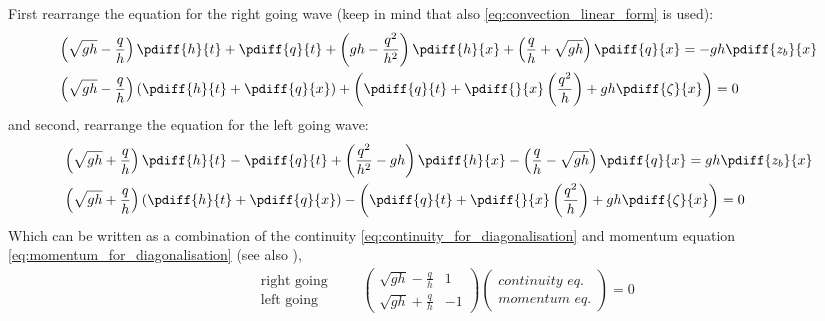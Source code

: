 First rearrange the equation for the right going wave (keep in mind that also \autoref{eq:convection_linear_form} is used):
\begin{align}
    &\left(\sqrt{gh} - \frac{q}{h}\right)\pdiff{h}{t} + \pdiff{q}{t} +
     \left( gh - \frac{q^2}{h^2} \right)\pdiff{h}{x} + \left( \frac{q}{h} + \sqrt{gh}\right) \pdiff{q}{x} = -gh\pdiff{z_b}{x}
     \\*
 &\left(\sqrt{gh} - \frac{q}{h}\right)\left(\pdiff{h}{t} + \pdiff{q}{x}\right) + \left( \pdiff{q}{t} + \pdiff{}{x} \left( \frac{q^2}{h} \right) +
 gh\pdiff{\zeta}{x}\right)   = 0
\end{align}
and second, rearrange the equation for the left going wave:
\begin{align}
    &\left(\sqrt{gh} + \frac{q}{h}\right)\pdiff{h}{t} - \pdiff{q}{t} +  \left( \frac{q^2}{h^2} - gh\right)\pdiff{h}{x} - \left( \frac{q}{h} - \sqrt{gh}\right)\pdiff{q}{x} = gh \pdiff{z_b}{x}
     \\*
    &\left(\sqrt{gh} + \frac{q}{h}\right)\left(\pdiff{h}{t} + \pdiff{q}{x}\right)  - \left( \pdiff{q}{t} + \pdiff{}{x} \left( \frac{q^2}{h} \right) + gh \pdiff{\zeta}{x} \right) = 0
\end{align}
Which can be written as a combination of the continuity \eqref{eq:continuity_for_diagonalisation} and momentum equation \eqref{eq:momentum_for_diagonalisation} (see also \citet[eq.\ 4]{Borsboom2001}),
\begin{align}
    \begin{matrix}
    \quad \text{right going} \\
    \quad \text{left going}
\end{matrix}
\qquad
    \begin{pmatrix}
        \sqrt{gh} - \frac{q}{h}  &  1 \\
        \sqrt{gh} + \frac{q}{h}  &  -1
    \end{pmatrix}
    \begin{pmatrix} \textit{continuity eq.} \\ \textit{momentum eq.} \end{pmatrix}    = 0
\end{align}
